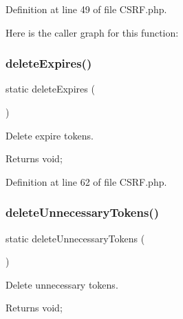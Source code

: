 Definition at line 49 of file C\+S\+R\+F.\+php.

Here is the caller graph for this function\+:
\mbox{\label{class_zest_1_1_c_s_r_f_1_1_c_s_r_f_ad6e098f8d854837403914ec1f8902472}} 
\subsubsection{\texorpdfstring{delete\+Expires()}{deleteExpires()}}
{\footnotesize\ttfamily static delete\+Expires (\begin{DoxyParamCaption}{ }\end{DoxyParamCaption})\hspace{0.3cm}{\ttfamily [static]}}

Delete expire tokens.

\begin{DoxyReturn}{Returns}
void; 
\end{DoxyReturn}


Definition at line 62 of file C\+S\+R\+F.\+php.

\mbox{\label{class_zest_1_1_c_s_r_f_1_1_c_s_r_f_aeb10e0979295026dd368be917b70b5e5}} 
\subsubsection{\texorpdfstring{delete\+Unnecessary\+Tokens()}{deleteUnnecessaryTokens()}}
{\footnotesize\ttfamily static delete\+Unnecessary\+Tokens (\begin{DoxyParamCaption}{ }\end{DoxyParamCaption})\hspace{0.3cm}{\ttfamily [static]}}

Delete unnecessary tokens.

\begin{DoxyReturn}{Returns}
void; 
\end{DoxyReturn}


